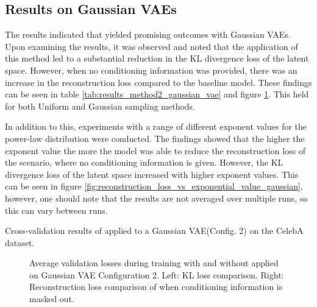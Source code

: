 
\subsection{Results on Gaussian VAEs}

The results indicated that  yielded promising outcomes with Gaussian VAEs. Upon examining the results, it was observed and noted that the application of this method led to a substantial reduction in the KL divergence loss of the latent space. However, when no conditioning information was provided, there was an increase in the reconstruction loss compared to the baseline model. These findings can be seen in table \ref{tab:results_method2_gaussian_vae} and figure \ref{fig:results_method2_gaussian_vae}. This held for both Uniform and Gaussian sampling methods.

In addition to this, experiments with a range of different exponent values for the power-law distribution were conducted. The findings showed that the higher the exponent value the more the model was able to reduce the reconstruction loss of the scenario, where no conditioning information is given. However, the KL divergence loss of the latent space increased with higher exponent values. This can be seen in figure \ref{fig:reconstruction_loss_vs_exponential_value_gaussian}, however, one should note that the results are not averaged over multiple runs, so this can vary between runs.


\begin{table}[H]
    \centering
    
    \caption{Cross-validation results of  applied to a Gaussian VAE(Config. 2) on the CelebA dataset.}
    \label{tab:results_method2_gaussian_vae}
\end{table}

\begin{figure}[H]
    \centering
    \scalebox{0.48}{}
    \scalebox{0.48}{}
    \caption[Validation loss during training with  applied on Gaussian VAE.]
    {
        Average validation losses during training with and without  applied on Gaussian VAE Configuration 2.
        Left: KL loss comparison. Right: Reconstruction loss comparison of when conditioning information is masked out.
    }
    \label{fig:results_method2_gaussian_vae}
\end{figure}

